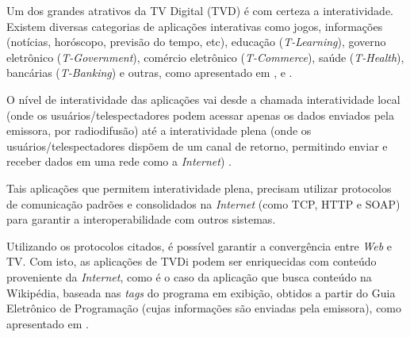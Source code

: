 
Um dos grandes atrativos da TV Digital (TVD) é com certeza a interatividade. Existem diversas categorias
de aplicações interativas como jogos, informações (notícias, horóscopo, previsão do tempo, etc), 
educação (\textit{T-Learning}), governo eletrônico (\textit{T-Government}), comércio eletrônico (\textit{T-Commerce}), 
saúde (\textit{T-Health}), bancárias (\textit{T-Banking}) e outras, como apresentado em \cite{fernandez2008aplicaciones},
\cite{de-usabilidade} e \cite{tgov2010barbosa}.

O nível de interatividade das aplicações vai desde a chamada interatividade local
(onde os usuários/telespectadores podem acessar apenas os dados enviados pela emissora, por radiodifusão)
até a interatividade plena (onde os usuários/telespectadores dispõem de um canal de retorno, permitindo
enviar e receber dados em uma rede como a \textit{Internet}) \cite{soares2009programando}. 

Tais aplicações que permitem interatividade plena, precisam utilizar protocolos de comunicação 
padrões e consolidados na \textit{Internet} (como TCP, HTTP e SOAP) para garantir a interoperabilidade
com outros sistemas. 

Utilizando os protocolos citados, é possível garantir a convergência entre \textit{Web} e TV.
Com isto, as aplicações de TVDi podem ser enriquecidas com conteúdo proveniente da \textit{Internet},
como é o caso da aplicação que busca conteúdo na Wikipédia, baseada nas \textit{tags}
do programa em exibição, obtidos a partir do Guia Eletrônico de Programação 
(cujas informações são enviadas pela emissora), 
como apresentado em \cite{socialnets-tvd2010ghisi}.

